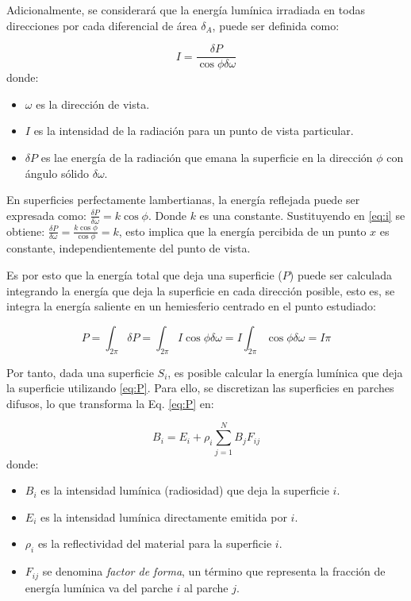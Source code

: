 Adicionalmente, se considerará que la energía lumínica irradiada en todas direcciones por cada diferencial de área $\delta_{A}$, puede ser definida como:

\begin{equation}
    I = \frac{\delta{P}}{\cos{\phi\delta\omega}} \label{eq:i}
\end{equation}
donde:
\begin{itemize}
	\item $\omega$ es la dirección de vista.
    \item $I$ es la intensidad de la radiación para un punto de vista particular.
    \item $\delta{P}$ es lae energía de la radiación que emana la superficie en la dirección $\phi$ con ángulo sólido $\delta\omega$.
\end{itemize}

En superficies perfectamente lambertianas, la energía reflejada puede ser expresada como: $\frac{\delta{P}}{\delta{\omega}} = k\cos{\phi}$. Donde $k$ es una constante.
Sustituyendo en \eqref{eq:i} se obtiene: $\frac{\delta{P}}{\delta{\omega}} = \frac{k\cos{\phi}}{\cos{\phi}} = k$, esto implica que la energía percibida de un punto $x$ 
es constante, independientemente del punto de vista.

Es por esto que la energía total que deja una superficie ($P$) puede ser calculada integrando la energía que deja la superficie en cada dirección posible, esto es, se integra la energía saliente en un hemiesferio centrado en el punto estudiado:

\begin{equation}
    P = \int_{2\pi} \delta{P} = \int_{2\pi} I\cos{\phi}\delta{\omega} = I \int_{2\pi} \cos{\phi}\delta{\omega} = I\pi
    \label{eq:P}
\end{equation}

Por tanto, dada una superficie $S_{i}$, es posible calcular la energía lumínica que deja la superficie utilizando \eqref{eq:P}. Para ello, se discretizan las superficies en parches difusos, lo que transforma la Eq. \eqref{eq:P} en:

\begin{equation}
    B_{i} = E_{i} + \rho_{i} \sum_{j=1}^{N} B_{j} F_{ij} \label{eq:radiosity}
\end{equation}
donde:
\begin{itemize}
    \item $B_{i}$ es la intensidad lumínica (radiosidad) que deja la superficie $i$.
    \item $E_{i}$ es la intensidad lumínica directamente emitida por $i$.
    \item $\rho_{i}$ es la reflectividad del material para la superficie $i$.
    \item $F_{ij}$ se denomina \textit{factor de forma}, un término que representa la fracción de energía lumínica va del parche $i$ al parche $j$. 
\end{itemize}


